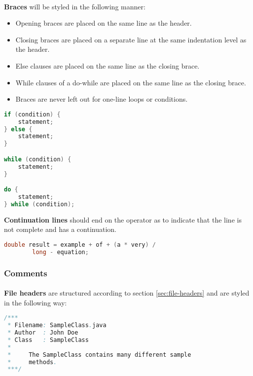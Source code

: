 \documentclass{article}
\begin{document}
    \paragraph{}
    \textbf{Braces} will be styled in the following manner:
    \begin{itemize}
        \item Opening braces are placed on the same line as the header.
        \item Closing braces are placed on a separate line at the same
                indentation level as the header.
        \item Else clauses are placed on the same line as the closing brace.
        \item While clauses of a do-while are placed on the same line as the
                closing brace.
        \item Braces are never left out for one-line loops or conditions.
    \end{itemize}

    \begin{lstlisting}[language=Java]
if (condition) {
    statement;
} else {
    statement;
}

while (condition) {
    statement;
}

do {
    statement;
} while (condition);
    \end{lstlisting}

    \textbf{Continuation lines} should end on the operator as to indicate that
    the line is not complete and has a continuation.

    \begin{lstlisting}[language=Java]
double result = example + of + (a * very) / 
        long - equation;
    \end{lstlisting}

    \subsubsection{Comments}
    \label{sec:java-com}

    \paragraph{}
    \textbf{File headers} are structured according to section
    \ref{sec:file-headers} and are styled in the following way:

    \begin{lstlisting}[language=Java]
/***
 * Filename: SampleClass.java
 * Author  : John Doe
 * Class   : SampleClass
 *
 *     The SampleClass contains many different sample
 *     methods.
 ***/
    \end{lstlisting}
\end{document}
